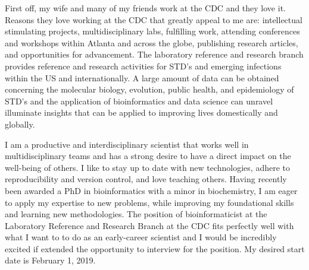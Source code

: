 \documentclass[11pt, letterpaper]{CV_latex_class}
\begin{document}
\begin{cvletter}

\hspace{1em} First off, my wife and many of my friends work at the CDC and they love it. Reasons they love working at the CDC that greatly appeal to me are: intellectual stimulating projects, multidisciplinary labs, fulfilling work, attending conferences and workshops within Atlanta and across the globe, publishing research articles, and opportunities for advancement. The laboratory reference and research branch provides reference and research activities for STD's and emerging infections within the US and internationally. A large amount of data can be obtained concerning the molecular biology, evolution, public health, and epidemiology of STD's and the application of bioinformatics and data science can unravel illuminate insights that can be applied to improving lives domestically and globally.



\hspace{1em} I am a productive and interdisciplinary scientist that works well in multidisciplinary teams and has a strong desire to have a direct impact on the well-being of others. I like to stay up to date with new technologies, adhere to reproducibility and version control, and love teaching others. Having recently been awarded a PhD in bioinformatics with a minor in biochemistry, I am eager to apply my expertise to new problems, while improving my foundational skills and learning new methodologies. The position of bioinformaticist at the Laboratory Reference and Research Branch at the CDC fits perfectly well with what I want to to do as an early-career scientist and I would be incredibly excited if extended the opportunity to interview for the position. My desired start date is February 1, 2019.

\end{cvletter}


\makeletterclosing

\end{document}
